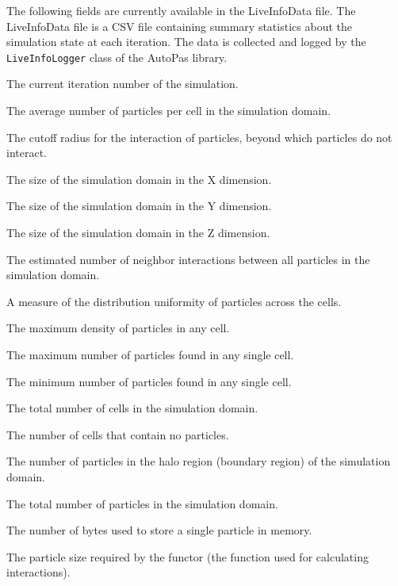 The following fields are currently available in the LiveInfoData file. The LiveInfoData file is a CSV file containing summary statistics about the simulation state at each iteration. The data is collected and logged by the \texttt{LiveInfoLogger} class of the AutoPas library.

\begin{description}[style=multiline, leftmargin =40mm]
  \item [Iteration] The current iteration number of the simulation.
  \item [avgParticlesPerCell] The average number of particles per cell in the simulation domain.
  \item [cutoff] The cutoff radius for the interaction of particles, beyond which particles do not interact.
  \item [domainSizeX] The size of the simulation domain in the X dimension.
  \item [domainSizeY] The size of the simulation domain in the Y dimension.
  \item [domainSizeZ] The size of the simulation domain in the Z dimension.
  \item [estimatedNumNeighborInteractions] The estimated number of neighbor interactions between all particles in the simulation domain.
  \item [homogeneity] A measure of the distribution uniformity of particles across the cells.
  \item [maxDensity] The maximum density of particles in any cell.
  \item [maxParticlesPerCell] The maximum number of particles found in any single cell.
  \item [minParticlesPerCell] The minimum number of particles found in any single cell.
  \item [numCells] The total number of cells in the simulation domain.
  \item [numEmptyCells] The number of cells that contain no particles.
  \item [numHaloParticles] The number of particles in the halo region (boundary region) of the simulation domain.
  \item [numParticles] The total number of particles in the simulation domain.
  \item [particleSize] The number of bytes used to store a single particle in memory.
  \item [particleSizeNeededByFunctor] The particle size required by the functor (the function used for calculating interactions).

\end{description}
